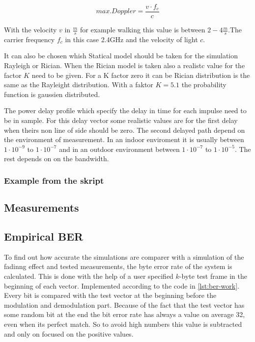 \begin{equation}
	max. Doppler = \frac{v\cdot f_c}{c}
\end{equation}

With the velocity \(v\) in \(\frac{m}{s}\) for example walking this value is between \(2-4\frac{m}{s}\).The carrier frequency \(f_c\) in this case 2.4GHz and the velocity of light \(c\).

It can also be chosen whish Statical model should be taken for the simulation Rayleigh or Rician. When the Rician model is taken also a realistc value for the factor \(K\) need to be given. For a K factor zero it can be Rician distribution is the same as the  Rayleight distribution. With a faktor \(K = 5.1\) the probability function is gaussien distributed.

The power delay profile which specify the delay in time for each impulse need to be in sample. For this delay vector some realistic values are for the first delay when theirs non line of side should be zero. The second delayed path depend on the environment of measurement. In an indoor enviroment it is usually between \(1\cdot10^{-9}\) to \(1\cdot10^{-7}\) and in an outdoor environment between \(1\cdot10^{-7}\) to \(1\cdot10^{-5}\). The rest depends on on the bandwidth. 

%	
%	


\subsubsection{Example from the skript}



\subsection{Measurements}


\subsection{Empirical BER} \label{sec:ber}
To find out how accurate the simulations are comparer with a simulation of the fadinng effect and tested measurements, the byte error rate of the system is calculated. This is done with the help of a user specified \(k\)-byte test frame in the beginning of each vector. Implemented according to the code in \ref{lst:ber-work}. Every bit is compared with the test vector at the beginning before the modulation and demodulation part. 
Because of the fact that the test vector has some random bit at the end the bit error rate has always a value on average 32, even when its perfect match.  So to avoid high numbers this value is subtracted and only on focused on the positive values. 

